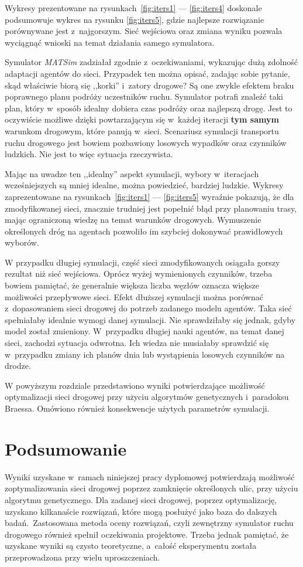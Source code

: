 \documentclass[twoside,12pt]{report}
\let\oldsection\chapter
\def\chapter{\cleardoublepage\oldsection}
\begin{document}
Wykresy prezentowane  na rysunkach~\ref{fig:iters1} --- \ref{fig:iters4} doskonale podsumowuje wykres na rysunku \ref{fig:iters5}, gdzie najlepsze rozwiązanie porównywane jest z~najgorszym. Sieć wejściowa oraz zmiana wyniku pozwala wyciągnąć wnioski na temat działania samego symulatora.

Symulator \textit{MATSim} zadziałał zgodnie z~oczekiwaniami, wykazując dużą zdolność adaptacji agentów do sieci. Przypadek ten można opisać, zadając sobie pytanie, skąd właściwie biorą się ,,korki'' i~zatory drogowe? Są one zwykle efektem braku poprawnego planu podróży uczestników ruchu. Symulator potrafi znaleźć taki plan, który w~sposób idealny dobiera czas podróży oraz najlepszą drogę. Jest to oczywiście możliwe dzięki powtarzającym się w~każdej iteracji \textbf{tym samym} warunkom drogowym, które panują w~sieci. Scenariusz symulacji transportu ruchu drogowego jest bowiem pozbawiony losowych wypadków oraz czynników ludzkich. Nie jest to więc sytuacja rzeczywista.

Mając na uwadze ten ,,idealny'' aspekt symulacji, wybory w~iteracjach wcześniejszych są mniej idealne, można powiedzieć, bardziej ludzkie. Wykresy zaprezentowane na rysunkach~\ref{fig:iters1} --- \ref{fig:iters5} wyraźnie pokazują, że dla zmodyfikowanej sieci, znacznie trudniej jest popełnić błąd przy planowaniu trasy, mając ograniczoną wiedzę na temat warunków drogowych. Wymuszenie określonych dróg na agentach pozwoliło im szybciej dokonywać prawidłowych wyborów.

W przypadku długiej symulacji, część sieci zmodyfikowanych osiągała gorszy rezultat niż sieć wejściowa. Oprócz wyżej wymienionych czynników, trzeba bowiem pamiętać, że generalnie większa liczba węzłów oznacza większe możliwości przepływowe sieci. Efekt dłuższej symulacji można porównać z~dopasowaniem sieci drogowej do potrzeb zadanego modelu agentów. Taka sieć spełniałaby idealnie wymogi danej symulacji. Nie sprawdziłaby się jednak, gdyby model został zmieniony. W~przypadku długiej nauki agentów, na temat danej sieci, zachodzi sytuacja odwrotna. Ich wiedza nie musiałaby sprawdzić się w~przypadku zmiany ich planów dnia lub wystąpienia losowych czynników na drodze. \newline

W powyższym rozdziale przedstawiono wyniki potwierdzające możliwość optymalizacji sieci drogowej przy użyciu algorytmów genetycznych i~paradoksu Braessa. Omówiono również konsekwencje użytych parametrów symulacji.

\chapter{Podsumowanie}\label{rozdz.podsumowanie} 
Wyniki uzyskane w~ramach niniejszej pracy dyplomowej potwierdzają możliwość zoptymalizowania sieci drogowej poprzez zamknięcie określonych ulic, przy użyciu algorytmu genetycznego. Dla zadanej sieci drogowej, poprzez optymalizację, uzyskano kilkanaście rozwiązań, które mogą posłużyć jako baza do dalszych badań.~Zastosowana metoda oceny rozwiązań, czyli zewnętrzny symulator ruchu drogowego również spełnił oczekiwania projektowe. Trzeba jednak pamiętać, że uzyskane wyniki są czysto teoretyczne, a~całość eksperymentu została przeprowadzona przy wielu uproszczeniach.
\end{document}
